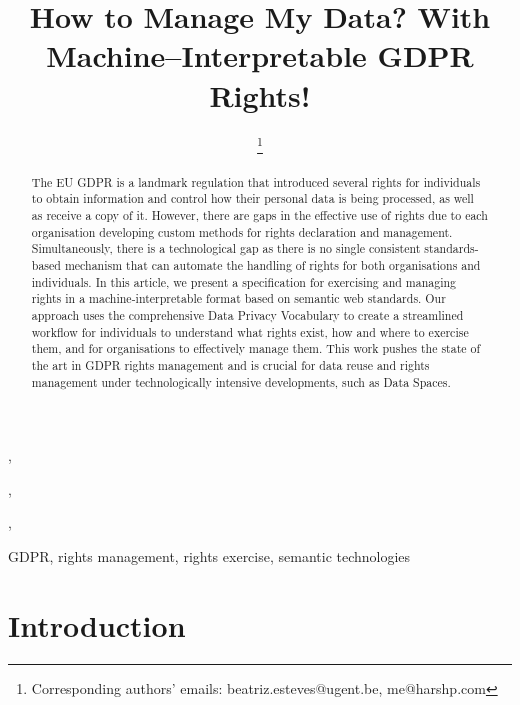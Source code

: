 \documentclass{IOS-Book-Article}     %
\begin{document}
\pagestyle{plain}
\begin{frontmatter}

\title{How to Manage My Data? With Machine--Interpretable GDPR Rights!}

\author[A]{ 
\thanks{Corresponding authors' emails: beatriz.esteves@ugent.be, me@harshp.com}},
\author[B]{ },
\author[C]{ },
\author[B,D]{ }
\address[A]{IDLab, Ghent University -- imec, Ghent, Belgium}
\address[B]{ADAPT Centre, Dublin City University, Dublin, Ireland}
\address[C]{Signatu AS, Oslo, Norway}
\address[D]{Uniphar PLC, Dublin, Ireland}

\begin{abstract}
The EU GDPR is a landmark regulation that introduced several rights for individuals to obtain information and control how their personal data is being processed, as well as receive a copy of it. However, there are gaps in the effective use of rights due to each organisation developing custom methods for rights declaration and management.
Simultaneously, there is a technological gap as there is no single consistent standards-based mechanism that can automate the handling of rights for both organisations and individuals.
In this article, we present a specification for exercising and managing rights in a machine-interpretable format based on semantic web standards.
Our approach uses the comprehensive Data Privacy Vocabulary to create a streamlined workflow for individuals to understand what rights exist, how and where to exercise them, and for organisations to effectively manage them.
This work pushes the state of the art in GDPR rights management and is crucial for data reuse and rights management under technologically intensive developments, such as Data Spaces.
\end{abstract}

\begin{keyword}
GDPR, rights management, rights exercise, semantic technologies
\end{keyword}

\end{frontmatter}

\section{Introduction}
\label{sec:intro}
\end{document}
